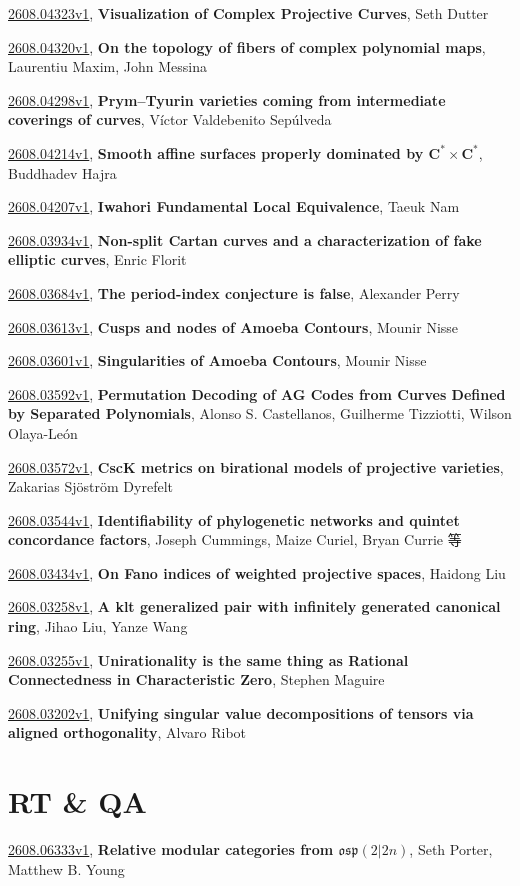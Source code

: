 \documentclass[9pt, a4paper]{article}
\theoremstyle{plain}
\theoremstyle{definition}
\theoremstyle{remark}
\newcommand{\arxiv}[3]{\href{https://arxiv.org/abs/#1}{#1}, \textbf{\textcolor{arxivblue}{#2}}, #3}
\begin{document}
\arxiv{2608.04323v1}{Visualization of Complex Projective Curves}{Seth Dutter}

\arxiv{2608.04320v1}{On the topology of fibers of complex polynomial maps}{Laurentiu Maxim, John Messina}

\arxiv{2608.04298v1}{Prym--Tyurin varieties coming from intermediate coverings of curves}{Víctor Valdebenito Sepúlveda}

\arxiv{2608.04214v1}{Smooth affine surfaces properly dominated by $\mathbf{C}^*\times\mathbf{C}^*$}{Buddhadev Hajra}

\arxiv{2608.04207v1}{Iwahori Fundamental Local Equivalence}{Taeuk Nam}

\arxiv{2608.03934v1}{Non-split Cartan curves and a characterization of fake elliptic curves}{Enric Florit}

\arxiv{2608.03684v1}{The period-index conjecture is false}{Alexander Perry}

\arxiv{2608.03613v1}{Cusps and nodes of Amoeba Contours}{Mounir Nisse}

\arxiv{2608.03601v1}{Singularities of Amoeba Contours}{Mounir Nisse}

\arxiv{2608.03592v1}{Permutation Decoding of AG Codes from Curves Defined by Separated Polynomials}{Alonso S. Castellanos, Guilherme Tizziotti, Wilson Olaya-León}

\arxiv{2608.03572v1}{CscK metrics on birational models of projective varieties}{Zakarias Sjöström Dyrefelt}

\arxiv{2608.03544v1}{Identifiability of phylogenetic networks and quintet concordance factors}{Joseph Cummings, Maize Curiel, Bryan Currie 等}

\arxiv{2608.03434v1}{On Fano indices of weighted projective spaces}{Haidong Liu}

\arxiv{2608.03258v1}{A klt generalized pair with infinitely generated canonical ring}{Jihao Liu, Yanze Wang}

\arxiv{2608.03255v1}{Unirationality is the same thing as Rational Connectedness in Characteristic Zero}{Stephen Maguire}

\arxiv{2608.03202v1}{Unifying singular value decompositions of tensors via aligned orthogonality}{Alvaro Ribot}


\section{RT \& QA}
\arxiv{2608.06333v1}{Relative modular categories from $\mathfrak{osp}(2 \vert 2n)$}{Seth Porter, Matthew B. Young}
\end{document}
